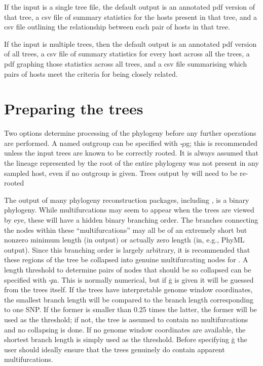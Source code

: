 If the input is a single tree file, the default output is an annotated pdf version of that tree, a csv file of summary statistics for the hosts present in that tree, and a csv file outlining the relationship between each pair of hosts in that tree.

If the input is multiple trees, then the default output is an annotated pdf version of all trees, a csv file of summary statistics for every host across all the trees, a pdf graphing those statistics across all trees, and a csv file summarising which pairs of hosts meet the criteria for being closely related.

\section{Preparing the trees}

Two options determine processing of the phylogeny before any further operations are performed.
A named outgroup can be specified with \c{-og}; this is recommended unless the input trees are known to be correctly rooted.
It is always assumed that the lineage represented by the root of the entire phylogeny was not present in any sampled host, even if no outgroup is given.
Trees output by \pmt will need to be re-rooted

The output of many phylogeny reconstruction packages, including \R, is a binary phylogeny.
While multifurcations may seem to appear when the trees are viewed by eye, these will have a hidden binary branching order.
The branches connecting the nodes within these ``multifurcations'' may all be of an extremely short but nonzero minimum length (in \R output) or actually zero length (in, e.g., PhyML output).
Since this branching order is largely arbitrary, it is recommended that these regions of the tree be collapsed into genuine multifurcating nodes for \pat.
A length threshold to determine pairs of nodes that should be so collapsed can be specified with \c{-m}.
This is normally numerical, but if \c{g} is given it will be guessed from the trees itself. If the trees have interpretable genome window coordinates, the smallest branch length will be compared to the branch length corresponding to one SNP. If the former is smaller than 0.25 times the latter, the former will be used as the threshold; if not, the tree is assumed to contain no multifurcations and no collapsing is done. If no genome window coordinates are available, the shortest branch length is simply used as the threshold. Before specifying \c{g} the user should ideally ensure that the trees genuinely do contain apparent multifurcations.

